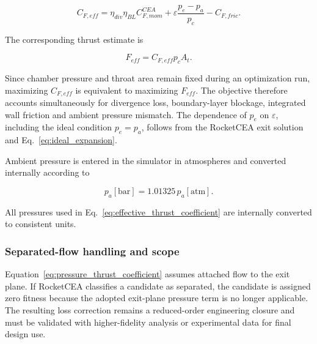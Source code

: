 \begin{equation}
\boxed{
C_{F,eff}
=
\eta_{div}\eta_{BL}C_{F,mom}^{CEA}
+
\varepsilon\frac{p_e-p_a}{p_c}
-C_{F,fric}
}.
\label{eq:effective_thrust_coefficient}
\end{equation}

The corresponding thrust estimate is

\begin{equation}
F_{eff}=C_{F,eff}p_cA_t.
\label{eq:effective_thrust}
\end{equation}

Since chamber pressure and throat area remain fixed during an optimization run,
maximizing \(C_{F,eff}\) is equivalent to maximizing \(F_{eff}\). The objective
therefore accounts simultaneously for divergence loss, boundary-layer blockage,
integrated wall friction and ambient pressure mismatch. The dependence of \(p_e\) on
\(\varepsilon\), including the ideal condition \(p_e=p_a\), follows from the
RocketCEA exit solution and Eq.~\eqref{eq:ideal_expansion}.

Ambient pressure is entered in the simulator in atmospheres and converted internally
according to

\begin{equation}
p_a[\mathrm{bar}]
=
1.01325\,p_a[\mathrm{atm}].
\label{eq:ambient_pressure_conversion}
\end{equation}

All pressures used in Eq.~\eqref{eq:effective_thrust_coefficient} are internally
converted to consistent units.

\subsubsection{Separated-flow handling and scope}

Equation~\eqref{eq:pressure_thrust_coefficient} assumes attached flow to the exit
plane. If RocketCEA classifies a candidate as separated, the candidate is assigned
zero fitness because the adopted exit-plane pressure term is no longer applicable.
The resulting loss correction remains a reduced-order engineering closure and must be
validated with higher-fidelity analysis or experimental data for final design use.
